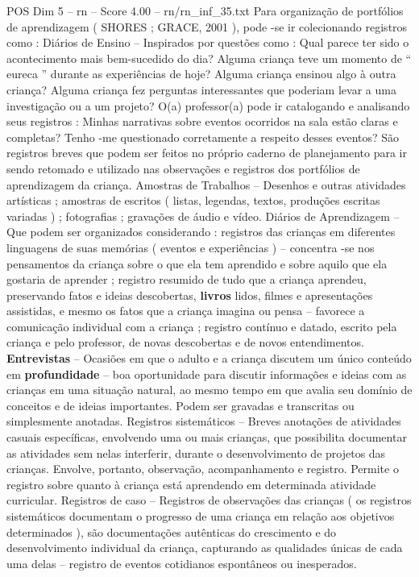 \begin{textsample}{POS Dim 5 – rn – Score 4.00 – rn/rn\_inf\_35.txt}
Para organização de portfólios de aprendizagem ( SHORES ; GRACE, 2001 ), pode -se ir colecionando registros como : Diários de Ensino – Inspirados por questões como : Qual parece ter sido o acontecimento mais bem-sucedido do dia?
Alguma criança teve um momento de “ eureca ” durante as experiências de hoje?
Alguma criança ensinou algo à outra criança?
Alguma criança fez perguntas interessantes que poderiam levar a uma investigação ou a um projeto?
O(a) professor(a) pode ir catalogando e analisando seus registros : Minhas narrativas sobre eventos ocorridos na sala estão claras e completas?
Tenho -me questionado corretamente a respeito desses eventos?
São registros breves que podem ser feitos no próprio caderno de planejamento para ir sendo retomado e utilizado nas observações e registros dos portfólios de aprendizagem da criança.
Amostras de Trabalhos – Desenhos e outras atividades artísticas ; amostras de escritos ( listas, legendas, textos, produções escritas variadas ) ; fotografias ; gravações de áudio e vídeo.
Diários de Aprendizagem – Que podem ser organizados considerando : registros das crianças em diferentes linguagens de suas memórias ( eventos e experiências ) – concentra -se nos pensamentos da criança sobre o que ela tem aprendido e sobre aquilo que ela gostaria de aprender ; registro resumido de tudo que a criança aprendeu, preservando fatos e ideias descobertas, \textbf{livros} lidos, filmes e apresentações assistidas, e mesmo os fatos que a criança imagina ou pensa – favorece a comunicação individual com a criança ; registro contínuo e datado, escrito pela criança e pelo professor, de novas descobertas e de novos entendimentos. \textbf{Entrevistas} – Ocasiões em que o adulto e a criança discutem um único conteúdo em \textbf{profundidade} – boa oportunidade para discutir informações e ideias com as crianças em uma situação natural, ao mesmo tempo em que avalia seu domínio de conceitos e de ideias importantes.
Podem ser gravadas e transcritas ou simplesmente anotadas.
Registros sistemáticos – Breves anotações de atividades casuais específicas, envolvendo uma ou mais crianças, que possibilita documentar as atividades sem nelas interferir, durante o desenvolvimento de projetos das crianças.
Envolve, portanto, observação, acompanhamento e registro.
Permite o registro sobre quanto à criança está aprendendo em determinada atividade curricular.
Registros de caso – Registros de observações das crianças ( os registros sistemáticos documentam o progresso de uma criança em relação aos objetivos determinados ), são documentações autênticas do crescimento e do desenvolvimento individual da criança, capturando as qualidades únicas de cada uma delas – registro de eventos cotidianos espontâneos ou inesperados.

\end{textsample}
